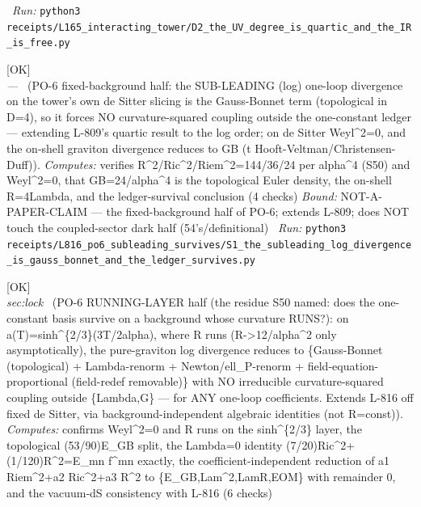 \begin{description}
\ \emph{Run:} \texttt{python3 receipts/L165\_interacting\_tower/D2\_the\_UV\_degree\_is\_quartic\_and\_the\_IR\_is\_free.py}
\item[\label{rcpt:S1_the_subleading_log_divergence_is_gauss_bonnet_and_the_ledger_survives}\textbf{}\quad\texttt{S1\_the\_subleading\_log\_divergence\_is\_gauss\_bonnet\_and\_the\_ledger\_survives}]\hfill\textsf{[OK]}\\
\textit{---} \ (PO-6 fixed-background half: the SUB-LEADING (log) one-loop divergence on the tower's own de Sitter slicing is the Gauss-Bonnet term (topological in D=4), so it forces NO curvature-squared coupling outside the one-constant ledger --- extending L-809's quartic result to the log order; on de Sitter Weyl\textasciicircum{}2=0, and the on-shell graviton divergence reduces to GB (t Hooft-Veltman/Christensen-Duff)). 
\emph{Computes:} verifies R\textasciicircum{}2/Ric\textasciicircum{}2/Riem\textasciicircum{}2=144/36/24 per alpha\textasciicircum{}4 (S50) and Weyl\textasciicircum{}2=0, that GB=24/alpha\textasciicircum{}4 is the topological Euler density, the on-shell R=4Lambda, and the ledger-survival conclusion (4 checks)
 \emph{Bound:} NOT-A-PAPER-CLAIM --- the fixed-background half of PO-6; extends L-809; does NOT touch the coupled-sector dark half (54's/definitional)
\ \emph{Run:} \texttt{python3 receipts/L816\_po6\_subleading\_survives/S1\_the\_subleading\_log\_divergence\_is\_gauss\_bonnet\_and\_the\_ledger\_survives.py}
\item[\label{rcpt:S1_the_one_constant_ledger_survives_on_the_running_layer_not_only_fixed_de_sitter}\textbf{}\quad\texttt{S1\_the\_one\_constant\_ledger\_survives\_on\_the\_running\_layer\_not\_only\_fixed\_de\_sitter}]\hfill\textsf{[OK]}\\
\textit{sec:lock} \ (PO-6 RUNNING-LAYER half (the residue S50 named: does the one-constant basis survive on a background whose curvature RUNS?): on a(T)=sinh\textasciicircum{}\{2/3\}(3T/2alpha), where R runs (R->12/alpha\textasciicircum{}2 only asymptotically), the pure-graviton log divergence reduces to \{Gauss-Bonnet (topological) + Lambda-renorm + Newton/ell\_P-renorm + field-equation-proportional (field-redef removable)\} with NO irreducible curvature-squared coupling outside \{Lambda,G\} --- for ANY one-loop coefficients. Extends L-816 off fixed de Sitter, via background-independent algebraic identities (not R=const)). 
\emph{Computes:} confirms Weyl\textasciicircum{}2=0 and R runs on the sinh\textasciicircum{}\{2/3\} layer, the topological (53/90)E\_GB split, the Lambda=0 identity (7/20)Ric\textasciicircum{}2+(1/120)R\textasciicircum{}2=E\_mn f\textasciicircum{}mn exactly, the coefficient-independent reduction of a1 Riem\textasciicircum{}2+a2 Ric\textasciicircum{}2+a3 R\textasciicircum{}2 to \{E\_GB,Lam\textasciicircum{}2,LamR,EOM\} with remainder 0, and the vacuum-dS consistency with L-816 (6 checks)

\end{description}
